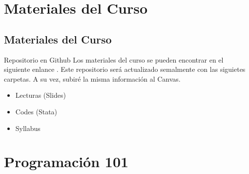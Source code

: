 \documentclass[11pt, aspectratio=169, compress]{beamer}
\begin{document}
\section{Materiales del Curso}
\subsection{Materiales del Curso}
\begin{frame}{Repositorio en Github}
	Los materiales del curso se pueden encontrar en el siguiente enlance \href{https://github.com/lambda-stata/course-materials}{\color{blue}{enlace}}. Este repositorio será actualizado semalmente con las siguietes carpetas. A su vez, subiré la misma información al Canvas.  
	\begin{itemize}
		\item Lecturas (Slides)
		\item Codes (Stata)
		\item Syllabus
	\end{itemize}
\end{frame}

\section{Programación 101}
\end{document}
